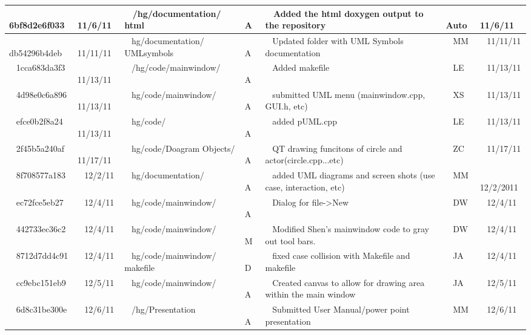 \documentclass[twoside,letterpaper]{article}
\begin{document}
\begin{flushleft}
\begin{supertabular}{|m{1.0in}|m{0.6in}|p{1.5in}|m{.25in}|m{2.0in}|m{.7in}|m{0.65in}|}
\\\hline
~
6bf8d2e6f033 &
~
11/6/11 &
~
/hg/documentation/ html &
~
A &
~
Added the html doxygen output to the repository &
~
Auto &
~
11/6/11


\\\hline
~
db54296b4deb &
~
11/11/11 &
~
hg/documentation/ UMLsymbols &
~
A &
~
Updated folder with UML Symbols documentation &
~
MM &
~
11/11/11


\\\hline
~
1cca683da3f3 &
~
11/13/11 &
~
/hg/code/mainwindow/ &
~
A &
~
Added makefile &
~
LE &
~
11/13/11


\\\hline
~
4d98e0c6a896 &
~
11/13/11 &
~
hg/code/mainwindow/ &
~
A &
~
submitted UML menu (mainwindow.cpp, GUI.h, etc) &
~
XS &
~
11/13/11


\\\hline
~
efce0b2f8a24 &
~
11/13/11 &
~
hg/code/ &
~
A &
~
added pUML.cpp &
~
LE &
~
11/13/11


\\\hline
~
2f45b5a240af &
~
11/17/11 &
~
hg/code/Doagram Objects/ &
~
A &
~
QT drawing funcitons of circle and actor(circle.cpp...etc) &
~
ZC &
~
11/17/11


\\\hline
~
8f708577a183 &
~
12/2/11 &
~
hg/documentation/ &
~
A &
~
added UML diagrams and screen shots (use case, interaction, etc) &
~
MM &
~
12/2/2011


\\\hline
~
ec72fce5eb27 &
~
12/4/11 &
~
hg/code/mainwindow/ &
~
A &
~
Dialog for file->New &
~
DW &
~
12/4/11

\\\hline
~
442733ec36c2 &
~
12/4/11 &
~
hg/code/mainwindow/  &
~
M &
~
Modified Shen's mainwindow code to gray out tool bars. &
~
DW &
~
12/4/11


\\\hline
~
8712d7dd4c91 &
~
12/4/11 &
~
hg/code/mainwindow/ makefile &
~
D &
~
fixed case collision with Makefile and makefile &
~
JA &
~
12/4/11


\\\hline
~
cc9ebc151eb9 &
~
12/5/11 &
~
hg/code/mainwindow/ &
~
A &
~
Created canvas to allow for drawing area within the main window &
~
JA &
~
12/5/11



\\\hline
~
6d8c31be300e &
~
12/6/11 &
~
/hg/Presentation &
~
A &
~
Submitted User Manual/power point presentation &
~
MM &
~
12/6/11



\end{supertabular}
\end{flushleft}
\end{document}
